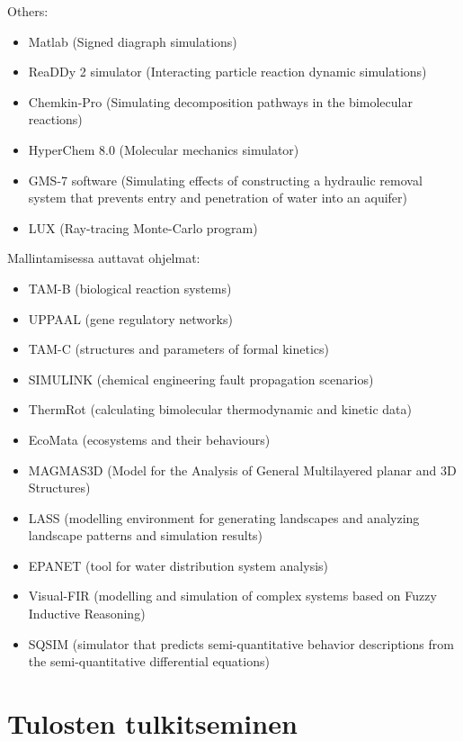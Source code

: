 \documentclass[utf8]{gradu3}
\begin{document}
Others:
\begin{itemize}
    \item Matlab (Signed diagraph simulations)
    \item ReaDDy 2 simulator (Interacting particle reaction dynamic simulations)
    \item Chemkin-Pro (Simulating decomposition pathways in the bimolecular reactions)
    \item HyperChem 8.0 (Molecular mechanics simulator)
    \item GMS-7 software (Simulating effects of constructing a hydraulic removal system that prevents entry and penetration of water into an aquifer)
    \item LUX (Ray-tracing Monte-Carlo program)
\end{itemize}

Mallintamisessa auttavat ohjelmat:
\begin{itemize}
    \item TAM-B (biological reaction systems)
    \item UPPAAL (gene regulatory networks)
    \item TAM-C (structures and parameters of formal kinetics)
    \item SIMULINK (chemical engineering fault propagation scenarios)
    \item ThermRot (calculating bimolecular thermodynamic and kinetic data)
    \item EcoMata (ecosystems and their behaviours)
    \item MAGMAS3D (Model for the Analysis of General Multilayered planar and 3D Structures)
    \item LASS (modelling environment for generating landscapes and analyzing landscape patterns and simulation results)
    \item EPANET (tool for water distribution system analysis)
    \item Visual-FIR (modelling and simulation of complex systems based on Fuzzy Inductive Reasoning)
    \item SQSIM (simulator that predicts semi-quantitative behavior descriptions from the  semi-quantitative differential equations)
\end{itemize}



\chapter{Tulosten tulkitseminen}
\end{document}
